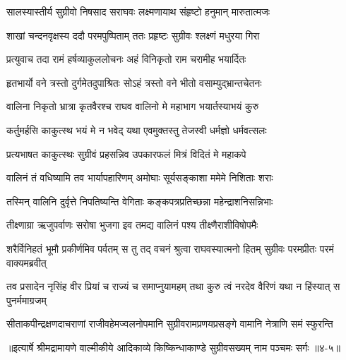 \twolineshloka
{सालस्यास्तीर्य सुग्रीवो निषसाद सराघवः}
{लक्ष्मणायाथ संहृष्टो हनुमान् मारुतात्मजः} %

\twolineshloka
{शाखां चन्दनवृक्षस्य ददौ परमपुष्पिताम्}
{ततः प्रहृष्टः सुग्रीवः श्लक्ष्णं मधुरया गिरा} %

\twolineshloka
{प्रत्युवाच तदा रामं हर्षव्याकुललोचनः}
{अहं विनिकृतो राम चरामीह भयार्दितः} %

\twolineshloka
{हृतभार्यो वने त्रस्तो दुर्गमेतदुपाश्रितः}
{सोऽहं त्रस्तो वने भीतो वसाम्युद्भ्रान्तचेतनः} %

\twolineshloka
{वालिना निकृतो भ्रात्रा कृतवैरश्च राघव}
{वालिनो मे महाभाग भयार्तस्याभयं कुरु} %

\twolineshloka
{कर्तुमर्हसि काकुत्स्थ भयं मे न भवेद् यथा}
{एवमुक्तस्तु तेजस्वी धर्मज्ञो धर्मवत्सलः} %

\twolineshloka
{प्रत्यभाषत काकुत्स्थः सुग्रीवं प्रहसन्निव}
{उपकारफलं मित्रं विदितं मे महाकपे} %

\twolineshloka
{वालिनं तं वधिष्यामि तव भार्यापहारिणम्}
{अमोघाः सूर्यसङ्काशा ममेमे निशिताः शराः} %

\twolineshloka
{तस्मिन् वालिनि दुर्वृत्ते निपतिष्यन्ति वेगिताः}
{कङ्कपत्रप्रतिच्छन्ना महेन्द्राशनिसन्निभाः} %

\twolineshloka
{तीक्ष्णाग्रा ऋजुपर्वाणः सरोषा भुजगा इव}
{तमद्य वालिनं पश्य तीक्ष्णैराशीविषोपमैः} %

\threelineshloka
{शरैर्विनिहतं भूमौ प्रकीर्णमिव पर्वतम्}
{स तु तद् वचनं श्रुत्वा राघवस्यात्मनो हितम्}
{सुग्रीवः परमप्रीतः परमं वाक्यमब्रवीत्} %

\twolineshloka
{तव प्रसादेन नृसिंह वीर प्रियां च राज्यं च समाप्नुयामहम्}
{तथा कुरु त्वं नरदेव वैरिणं यथा न हिंस्यात् स पुनर्ममाग्रजम्} %

\twolineshloka
{सीताकपीन्द्रक्षणदाचराणां राजीवहेमज्वलनोपमानि}
{सुग्रीवरामप्रणयप्रसङ्गे वामानि नेत्राणि समं स्फुरन्ति} %


॥इत्यार्षे श्रीमद्रामायणे वाल्मीकीये आदिकाव्ये किष्किन्धाकाण्डे सुग्रीवसख्यम् नाम पञ्चमः सर्गः ॥४-५॥
